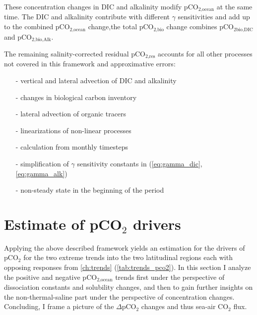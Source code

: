 These concentration changes in \acs{DIC} and alkalinity modify pCO$_{\text{2,ocean}}$ at the same time.  The \acs{DIC} and alkalinity contribute with different $\gamma$ sensitivities and add up to the combined pCO$_{\text{2,ocean}}$ change,\eg the total pCO$_{\text{2,bio}}$ change combines pCO$_{\text{2bio,DIC}}$ and pCO$_{\text{2,bio,Alk}}$.\newline

The remaining salinity-corrected residual pCO$_{\text{2,res}}$ accounts for all other processes not covered in this framework and approximative errors: 
\begin{itemize}
\item[-] vertical and lateral advection of \acs{DIC} and alkalinity
\item[-] changes in biological carbon inventory
\item[-] lateral advection of organic tracers
\item[-] linearizations of non-linear processes
\item[-] calculation from monthly timesteps
\item[-] simplification of $\gamma$ sensitivity constants in \cite{Sarmiento2006} (\autoref{eq:gamma_dic}, \ref{eq:gamma_alk})
\item[-] non-steady state in the beginning of the period
\end{itemize}



\clearpage
\section{Estimate of pCO$_2$ drivers}


Applying the above described framework yields an estimation for the drivers of pCO$_2$ for the two extreme trends into the two latitudinal regions each with opposing responses from \autoref{ch:trends}  (\autoref{tab:trends_pco2}). In this section I analyze the positive and negative pCO$_{\text{2,ocean}}$ trends first under the perspective of dissociation constants and solubility changes, and then to gain further insights on the non-thermal-saline part under the perspective of concentration changes. Concluding, I frame a picture of the $\Delta$pCO$_2$ changes and thus sea-air CO$_2$ flux.

